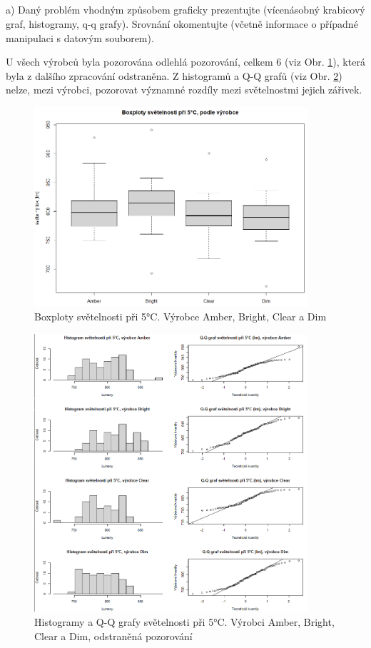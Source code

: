 \documentclass[czech]{article}%
\begin{document}
\subsection{}
a)	Daný problém vhodným způsobem graficky prezentujte (vícenásobný krabicový graf, histogramy, q-q grafy). 
Srovnání okomentujte (včetně informace o případné manipulaci s datovým souborem).

U všech výrobců byla pozorována odlehlá pozorování, celkem 6 (viz Obr. \ref{fig:Boxplot3}), která byla z dalšího zpracování odstraněna.
Z histogramů a Q-Q grafů (viz Obr. \ref{fig:QQaHist_3}) nelze, mezi výrobci, pozorovat významné rozdíly mezi světelnostmi jejich zářivek.

\begin{figure}[H]
	\centering
	\includegraphics[width=0.9\textwidth]{Figures/Boxploty_3.png}
	\caption{Boxploty světelnosti při 5°C. Výrobce Amber, Bright, Clear a Dim}
	\label{fig:Boxplot3}
\end{figure}


\begin{figure}[H]
	\centering
	\includegraphics[width=0.9\textwidth]{Figures/QQaHistogram_3.png}
	\caption{Histogramy a Q-Q grafy světelnosti při 5°C. Výrobci Amber, Bright, Clear a Dim, odstraněná pozorování}
	\label{fig:QQaHist_3}
\end{figure}
\end{document}
